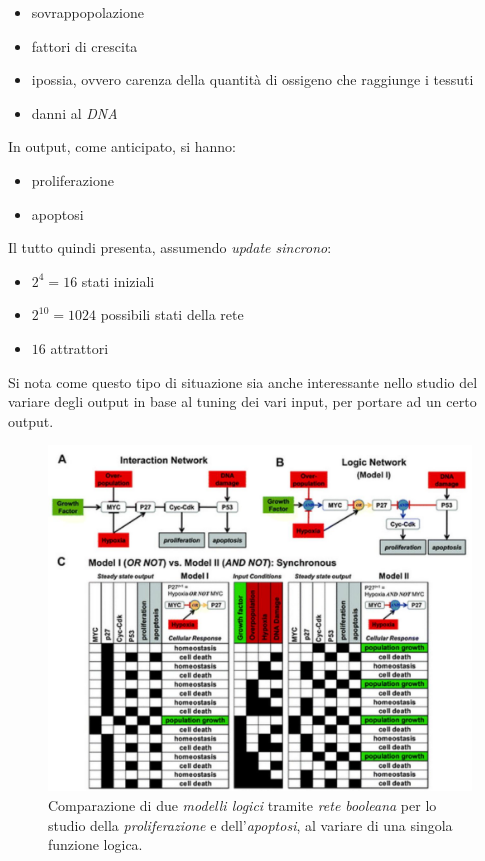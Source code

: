 \documentclass[a4paper,12pt, oneside]{book}
\begin{document}
\begin{itemize}
  \item sovrappopolazione
  \item fattori di crescita
  \item ipossia, ovvero carenza della quantità di ossigeno che raggiunge i
  tessuti 
  \item danni al \textit{DNA}
\end{itemize}
In output, come anticipato, si hanno:
\begin{itemize}
  \item proliferazione
  \item apoptosi
\end{itemize}
Il tutto quindi presenta, assumendo \textit{update sincrono}:
\begin{itemize}
  \item $2^4=16$ stati iniziali
  \item $2^{10}=1024$ possibili stati della rete
  \item $16$ attrattori
\end{itemize}
Si nota come questo tipo di situazione sia anche interessante nello studio del
variare degli output in base al tuning dei vari input, per portare ad un certo
output. \\
\begin{figure}
  \centering
  \includegraphics[scale = 0.25]{img/exbool2.jpg}
  \caption{Comparazione di due \textit{modelli logici} tramite \textit{rete
      booleana} per lo studio  della \textit{proliferazione} e
    dell'\textit{apoptosi}, al variare di una singola funzione logica.}  
  \label{fig:exbool2}
\end{figure}
\end{document}
